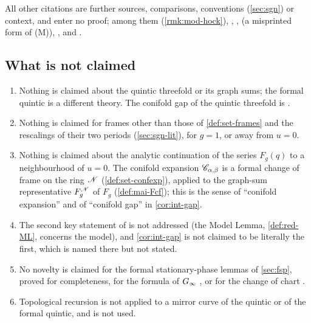 All other citations are further sources, comparisons, conventions (\cref{sec:sgn}) or context, and enter no proof; among them \cite[Corollary~1.2]{Hock25} (\cref{rmk:mod-hock}), \cite[Theorem~4.4, (4-23); Corollary~4.1, (4-26)--(4-29); (A-1), (A-5), (A-25); Theorem~4.7, (4-30); (5-15)]{Eynard:2007kz}, \cite[(26)]{LP20}, \cite[Corollary~11.7]{MR1408320} (a misprinted form of (M)), \cite[Props.~6.1--6.2]{GR19}, \cite[\S2.4.3, (17); \S2.4.4, (19)--(20)]{LP20} and \cite{CGYZ26}.

\subsection{What is not claimed}
\label{sec:int-notclaimed}

\begin{enumerate}
\item Nothing is claimed about the quintic threefold or its graph sums; the formal quintic is a different theory. The conifold gap of the quintic threefold is \cite[Theorem~2]{CGYZ26}.
\item Nothing is claimed for frames other than those of \cref{def:set-frames} and the rescalings of their two periods (\cref{sec:sgn-lit}), for $g=1$, or away from $u=0$.
\item Nothing is claimed about the analytic continuation of the series $F_g(q)$ to a neighbourhood of $u=0$. The conifold expansion $\mathscr{C}_{\alpha,\beta}$ is a formal change of frame on the ring $\mathscr{N}$ (\cref{def:set-confexp}), applied to the graph-sum representative $F_g^{\mathscr{N}}$ of $F_g$ (\cref{def:mai-Fcf}); this is the sense of ``conifold expansion'' and of ``conifold gap'' in \cref{cor:int-gap}.
\item The second key statement of \cite[Remark~1.9]{CGYZ26} is not addressed (the Model Lemma, \cref{def:red-ML}, concerns the model), and \cref{cor:int-gap} is not claimed to be literally the first, which is named there but not stated.
\item No novelty is claimed for the formal stationary-phase lemmas of \cref{sec:fsp}, proved for completeness, for the formula of $G_{\infty}$ \cite[Lemma~7.7, (37)]{GJR18}, or for the change of chart \cite[\S10]{MR1901075}.
\item Topological recursion is not applied to a mirror curve of the quintic or of the formal quintic, and \cite{FCCZ26} is not used.
\end{enumerate}

